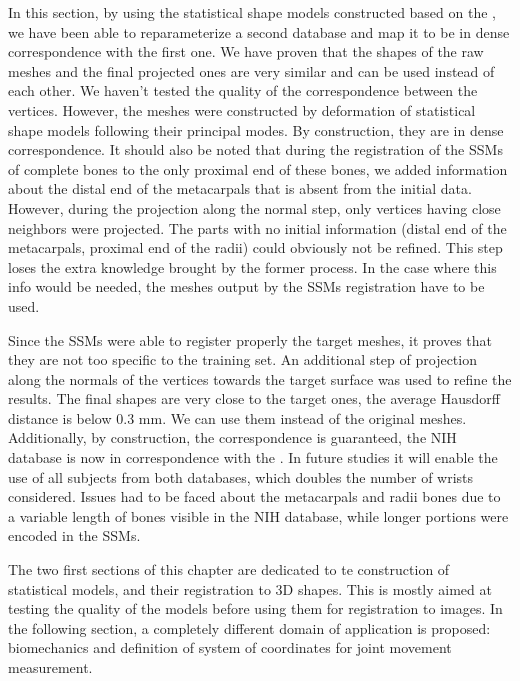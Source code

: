 In this section, by using the statistical shape models constructed based on the \db*, we have been able to reparameterize a second database and map it to be in dense correspondence with the first one.
We have proven that the shapes of the raw meshes and the final projected ones are very similar and can be used instead of each other. We haven't tested the quality of the correspondence between the vertices. However, the meshes were constructed by deformation of statistical shape models following their principal modes. By construction, they are in dense correspondence. 
It should also be noted that during the registration of the SSMs of complete bones to the only proximal end of these bones, we added information about the distal end of the metacarpals that is absent from the initial data. However, during the projection along the normal step, only vertices having close neighbors were projected. The parts with no initial information (distal end of the metacarpals, proximal end of the radii) could obviously not be refined. This step loses the extra knowledge brought by the former process. In the case where this info would be needed, the meshes output by the SSMs registration have to be used. 


 Since the SSMs were able to register properly the target meshes, it proves that they are not too specific to the training set. An additional step of projection along the normals of the vertices towards the target surface was used to refine the results. The final shapes are very close to the target ones, the average Hausdorff distance is below $0.3$ mm. We can use them instead of the original meshes. Additionally, by construction, the correspondence is guaranteed, the NIH database is now in correspondence with the \db*. In future studies it will enable the use of all subjects from both databases, which doubles the number of wrists considered. Issues had to be faced about the metacarpals and radii bones due to a variable length of bones visible in the NIH database, while longer portions were encoded in the SSMs. 

The two first sections of this chapter are dedicated to te construction of statistical models, and their registration to 3D shapes. This is mostly aimed at testing the quality of the models before using them for registration to images. In the following section, a completely different domain of application is proposed: biomechanics and definition of system of coordinates for joint movement measurement. 

